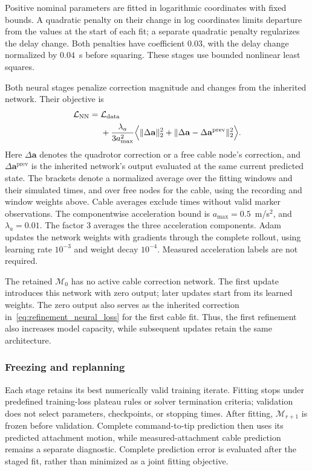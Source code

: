 \documentclass[letterpaper, 10 pt, conference]{ieeeconf}
\begin{document}
Positive nominal parameters are fitted in logarithmic coordinates
with fixed bounds. A quadratic penalty on their change in log
coordinates limits departure from the values at the start of each
fit; a separate quadratic penalty regularizes the delay change.
Both penalties have coefficient $0.03$, with the delay change
normalized by $0.04$~s before squaring. These stages use bounded
nonlinear least squares.

Both neural stages penalize correction magnitude and changes from
the inherited network. Their objective is
\begin{equation}
\begin{aligned}
\mathcal L_{\mathrm{NN}}
={}&\mathcal L_{\mathrm{data}}\\
&+\frac{\lambda_a}{3a_{\max}^2}
\Bigl\langle\|\Delta\mathbf a\|_2^2
+\|\Delta\mathbf a
 -\Delta\mathbf a^{\mathrm{prev}}\|_2^2\Bigr\rangle.
\end{aligned}
\label{eq:refinement_neural_loss}
\end{equation}
Here $\Delta\mathbf a$ denotes the quadrotor correction or a free
cable node's correction, and $\Delta\mathbf a^{\mathrm{prev}}$
is the inherited network's output evaluated at the same current
predicted state. The brackets denote a normalized average over
the fitting windows and their simulated times, and over free
nodes for the cable, using the recording and window weights above.
Cable averages exclude times without valid
marker observations. The componentwise acceleration bound is
$a_{\max}=0.5$~m/s$^2$, and $\lambda_a=0.01$.
The factor $3$ averages the three acceleration components.
Adam updates the network weights with gradients through the
complete rollout, using learning rate $10^{-3}$ and weight decay
$10^{-4}$. Measured acceleration labels are not required.

The retained $\mathcal M_0$ has no active cable correction network.
The first update introduces this network with zero output; later
updates start from its learned weights. The zero output also serves
as the inherited correction in~\eqref{eq:refinement_neural_loss}
for the first cable fit. Thus, the first refinement
also increases model capacity, while subsequent updates retain
the same architecture.

\subsubsection{Freezing and replanning}
Each stage retains its best numerically valid training iterate.
Fitting stops under predefined training-loss plateau rules or
solver termination criteria; validation does not select parameters,
checkpoints, or stopping times. After fitting, $\mathcal M_{r+1}$
is frozen before validation. Complete command-to-tip prediction
then uses its predicted attachment motion, while measured-attachment
cable prediction remains a separate diagnostic. Complete prediction
error is evaluated after the staged fit, rather than minimized
as a joint fitting objective.
\end{document}
